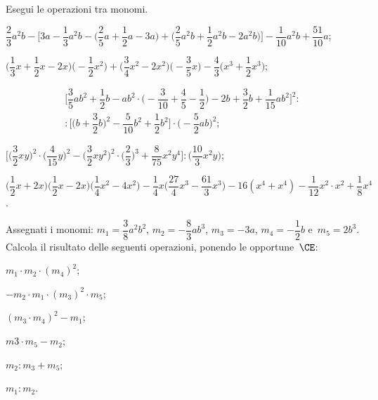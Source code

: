 \begin{esercizio}[\Ast]
 \label{ese:9.36}
Esegui le operazioni tra monomi.

\begin{enumeratea}
 \item $\dfrac{2}{3}a^{2}b-\bigg[3a-\dfrac{1}{3}a^{2}b-\bigg(\dfrac{2}{5}a+\dfrac{1}{2}a-3a\bigg)+\bigg(\dfrac{2}{5}a^{2}b+\dfrac{1}{2}a^{2}b-2a^{2}b\bigg)\bigg]%
 -\dfrac{1}{10}a^{2}b+\dfrac{51}{10}a$;
 \item $\bigg(\dfrac{1}{3}x+\dfrac{1}{2}x-2x\bigg)\bigg(-{\dfrac{1}{2}x^{2}}\bigg)+\bigg(\dfrac{3}{4}x^{2}-2x^{2}\bigg)\bigg(-{\dfrac{3}{5}x}\bigg)%
 -\dfrac{4}{3}\bigg(x^{3}+\dfrac{1}{2}x^{3}\bigg)$;
 \item \begin{multline*}
 \Bigg[\dfrac{3}{5}ab^{2}+\dfrac{1}{2}b-ab^{2}\cdot\bigg(-{\dfrac{3}{10}}+\dfrac{4}{5}-\dfrac{1}{2}\bigg)-2b+\dfrac{3}{2}b+\dfrac{1}{15}ab^{2}\Bigg]^{2}:\\%
:\bigg[\bigg(b+\dfrac{3}{2}b\bigg)^{2}-\dfrac{5}{10}b^{2}+\dfrac{1}{2}b^{2}\bigg]\cdot\bigg(-{\dfrac{5}{2}ab}\bigg)^{2};
 \end{multline*}
 \item $\bigg[\bigg(\dfrac{3}{2}xy\bigg)^{2}\cdot(\dfrac{4}{15}y\bigg)^{2}-\bigg(\dfrac{3}{2}xy^{2}\bigg)^{2}\cdot\bigg(\dfrac{2}{3}\bigg)^{3}%
 +\dfrac{8}{75}x^{2}y^{4}\bigg]:\bigg(\dfrac{10}{3}x^{2}y\bigg)$;
 \item $\bigg(\dfrac{1}{2}x+2x\bigg)\bigg(\dfrac{1}{2}x-2x\bigg)\bigg(\dfrac{1}{4}x^{2}-4x^{2}\bigg)-\dfrac{1}{4}x\bigg(\dfrac{27}{4}x^{3}-\dfrac{61}{3}x^{3}\bigg)%
 -16(x^{4}+x^{4})-\dfrac{1}{12}x^{2}\cdot x^{2}+\dfrac{1}{8}x^{4}$.
\end{enumeratea}
\end{esercizio}


\begin{esercizio}
 \label{ese:9.37}
Assegnati i monomi:
$m_{{1}}=\dfrac{3}{8}a^{2}b^{2}$, $m_{2}=-{\dfrac{8}{3}}ab^{3}$, $m_{3}=-3a$, $m_{{4}}=-{\dfrac{1}{2}}b$ e~$m_{{5}}=2b^{3}$.
Calcola il risultato delle seguenti operazioni, ponendo le opportune~$\CE$:
\begin{multicols}{3}
\begin{enumeratea}
 \item $m_{{1}}\cdot m_{2}\cdot (m_{{4}})^{2}$;
 \item $-m_{2}\cdot m_{{1}}\cdot (m_{3})^{2}\cdot m_{{5}}$;
 \item $(m_{3}\cdot m_{{4}})^{2}-m_{{1}}$;
 \item $m3\cdot m_{{5}}-m_{2}$;
 \item $m_{2}:m_{3}+m_{{5}}$;
 \item $m_{{1}}:m_{2}$.
\end{enumeratea}
\end{multicols}
\end{esercizio}


